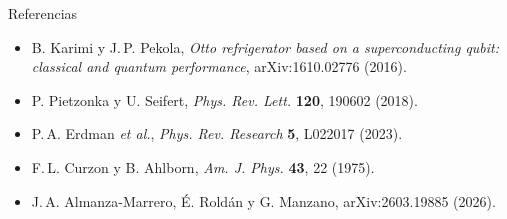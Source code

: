 \documentclass[10pt,aspectratio=169]{beamer}
\begin{document}
\begin{frame}{Referencias}
\small
\begin{itemize}
\setlength{\itemsep}{4pt}
\item B. Karimi y J.\,P. Pekola, \emph{Otto refrigerator based on a superconducting qubit: classical and quantum performance}, arXiv:1610.02776 (2016).
\item P. Pietzonka y U. Seifert, \emph{Phys. Rev. Lett.} \textbf{120}, 190602 (2018).
\item P.\,A. Erdman \emph{et al.}, \emph{Phys. Rev. Research} \textbf{5}, L022017 (2023).
\item F.\,L. Curzon y B. Ahlborn, \emph{Am. J. Phys.} \textbf{43}, 22 (1975).
\item J.\,A. Almanza-Marrero, É. Roldán y G. Manzano, arXiv:2603.19885 (2026).
\end{itemize}
\end{frame}
\end{document}
